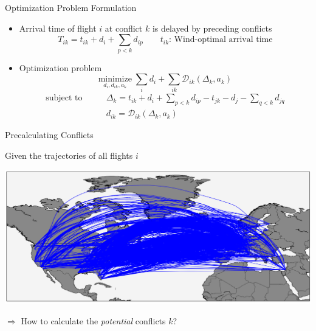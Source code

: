 \documentclass[10pt]{beamer}
\begin{document}
\begin{frame}[t]{Optimization Problem Formulation}
    \begin{itemize}
        \item Arrival time of flight $i$ at conflict $k$ is delayed by preceding conflicts
            \begin{equation*}
                T_{ik} = t_{ik} + d_i +  \sum_{p<k} d_{ip} \qquad t_{ik} \text{: Wind-optimal arrival time}
            \end{equation*}
        \item Optimization problem 
            \begin{equation*}
                \underset{d_i, d_{ik}, a_k}{\text{minimize}} \; \sum_i d_i + \sum_{ik} \mathcal{D}_{ik}(\Delta_{k}, a_k)
            \end{equation*}
            \begin{align*}
                \text{subject to} \qquad
                & \Delta_{k} = t_{ik} + d_i + \sum_{p<k} d_{ip} - t_{jk} - d_j - \sum_{q<k} d_{jq} \\
                & d_{ik} = \mathcal{D}_{ik}(\Delta_{k}, a_k) 
            \end{align*}

    \end{itemize}
\end{frame}
\begin{frame}[t]{Precalculating Conflicts}
    \begin{minipage}[t]{0.4\linewidth}
        Given the trajectories of all flights $i$ 
    \end{minipage}
    \hfill
    \begin{minipage}[c]{0.5\linewidth}
        \includegraphics[width=1.0\textwidth]{images/wind_optimal_trajectories.png}
    \end{minipage}
    \vspace{1cm}
    \begin{center}
        $\Rightarrow$ How to calculate the \emph{potential} conflicts $k$?
    \end{center}
\end{frame}
\end{document}
